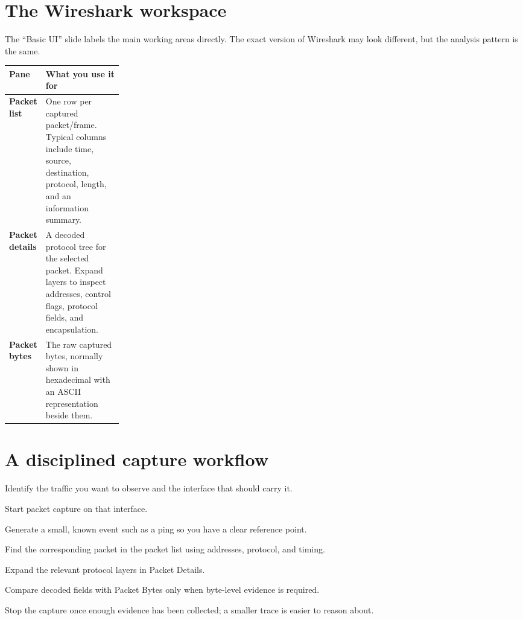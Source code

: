 
\section{The Wireshark workspace}
The ``Basic UI'' slide labels the main working areas directly. The exact version of Wireshark may look different, but the analysis pattern is the same.


\begin{tabularx}{\linewidth}{>{\bfseries}p{0.22\linewidth}X}
\toprule
Pane & What you use it for\\\midrule
Packet list & One row per captured packet/frame. Typical columns include time, source, destination, protocol, length, and an information summary.\\
Packet details & A decoded protocol tree for the selected packet. Expand layers to inspect addresses, control flags, protocol fields, and encapsulation.\\
Packet bytes & The raw captured bytes, normally shown in hexadecimal with an ASCII representation beside them.\\\bottomrule
\end{tabularx}

\section{A disciplined capture workflow}
\begin{netsteps}
\item Identify the traffic you want to observe and the interface that should carry it.
\item Start packet capture on that interface.
\item Generate a small, known event such as a ping so you have a clear reference point.
\item Find the corresponding packet in the packet list using addresses, protocol, and timing.
\item Expand the relevant protocol layers in Packet Details.
\item Compare decoded fields with Packet Bytes only when byte-level evidence is required.
\item Stop the capture once enough evidence has been collected; a smaller trace is easier to reason about.
\end{netsteps}

